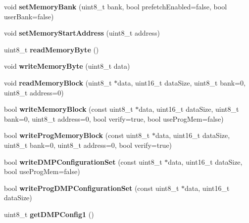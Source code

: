 \begin{DoxyCompactItemize}
void {\bfseries set\+Memory\+Bank} (uint8\+\_\+t bank, bool prefetch\+Enabled=false, bool user\+Bank=false)
\item 
\mbox{\label{classMPU6050_a45013abb39103e858d432cc720bc351a}} 
void {\bfseries set\+Memory\+Start\+Address} (uint8\+\_\+t address)
\item 
\mbox{\label{classMPU6050_a4fb50ebcff2f4e686e3fbbafb70a1f75}} 
uint8\+\_\+t {\bfseries read\+Memory\+Byte} ()
\item 
\mbox{\label{classMPU6050_a20de45af9109402f0cfe785f8fdbf439}} 
void {\bfseries write\+Memory\+Byte} (uint8\+\_\+t data)
\item 
\mbox{\label{classMPU6050_a04d8d5e7b62605aed15f07f52afa74ca}} 
void {\bfseries read\+Memory\+Block} (uint8\+\_\+t $\ast$data, uint16\+\_\+t data\+Size, uint8\+\_\+t bank=0, uint8\+\_\+t address=0)
\item 
\mbox{\label{classMPU6050_aae135772b45e1c7968b55f4f01b3757f}} 
bool {\bfseries write\+Memory\+Block} (const uint8\+\_\+t $\ast$data, uint16\+\_\+t data\+Size, uint8\+\_\+t bank=0, uint8\+\_\+t address=0, bool verify=true, bool use\+Prog\+Mem=false)
\item 
\mbox{\label{classMPU6050_a201dc0aa819f451584c575c5a7590e10}} 
bool {\bfseries write\+Prog\+Memory\+Block} (const uint8\+\_\+t $\ast$data, uint16\+\_\+t data\+Size, uint8\+\_\+t bank=0, uint8\+\_\+t address=0, bool verify=true)
\item 
\mbox{\label{classMPU6050_abe4f64f68164116b2ec94fe1d987929a}} 
bool {\bfseries write\+D\+M\+P\+Configuration\+Set} (const uint8\+\_\+t $\ast$data, uint16\+\_\+t data\+Size, bool use\+Prog\+Mem=false)
\item 
\mbox{\label{classMPU6050_a160a3d018a81eb85a33874a43f44b3ea}} 
bool {\bfseries write\+Prog\+D\+M\+P\+Configuration\+Set} (const uint8\+\_\+t $\ast$data, uint16\+\_\+t data\+Size)
\item 
\mbox{\label{classMPU6050_a421cdf4cea9fea87decbd69084ba4956}} 
uint8\+\_\+t {\bfseries get\+D\+M\+P\+Config1} ()
\item 

\end{DoxyCompactItemize}
